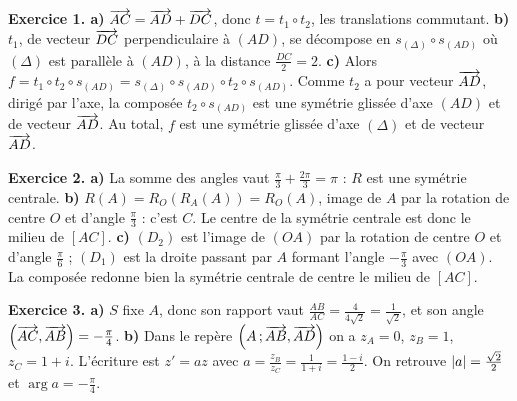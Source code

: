 \begin{corrige}
\textbf{Exercice 1. a)} $\overrightarrow{AC} = \overrightarrow{AD}+\overrightarrow{DC}$, donc
$t = t_{1} \circ t_{2}$, les translations commutant.
\textbf{b)} $t_{1}$, de vecteur $\overrightarrow{DC}$ perpendiculaire à $(AD)$, se
décompose en $s_{(\Delta)} \circ s_{(AD)}$ où $(\Delta)$ est parallèle à
$(AD)$, à la distance $\frac{DC}{2} = 2$.
\textbf{c)} Alors
$f = t_{1} \circ t_{2} \circ s_{(AD)}
= s_{(\Delta)} \circ s_{(AD)} \circ t_{2} \circ s_{(AD)}$. Comme $t_{2}$ a
pour vecteur $\overrightarrow{AD}$, dirigé par l'axe, la composée
$t_{2} \circ s_{(AD)}$ est une symétrie glissée d'axe $(AD)$ et de vecteur
$\overrightarrow{AD}$. Au total, $f$ est une symétrie glissée d'axe $(\Delta)$ et de
vecteur $\overrightarrow{AD}$.

\textbf{Exercice 2. a)} La somme des angles vaut $\frac{\pi}{3}+\frac{2\pi}{3} = \pi$ :
$R$ est une symétrie centrale.
\textbf{b)} $R(A) = R_{O}\left(R_{A}(A)\right) = R_{O}(A)$, image de $A$ par
la rotation de centre $O$ et d'angle $\frac{\pi}{3}$ : c'est $C$. Le centre de
la symétrie centrale est donc le milieu de $[AC]$.
\textbf{c)} $(D_{2})$ est l'image de $(OA)$ par la rotation de centre $O$ et
d'angle $\frac{\pi}{6}$ ; $(D_{1})$ est la droite passant par $A$ formant
l'angle $-\frac{\pi}{3}$ avec $(OA)$. La composée redonne bien la symétrie
centrale de centre le milieu de $[AC]$.

\textbf{Exercice 3. a)} $S$ fixe $A$, donc son rapport vaut
$\frac{AB}{AC} = \frac{4}{4\sqrt2} = \frac{1}{\sqrt2}$, et son angle
$\left(\overrightarrow{AC},\overrightarrow{AB}\right) = -\frac{\pi}{4}$.
\textbf{b)} Dans le repère $\left(A\,;\overrightarrow{AB},\overrightarrow{AD}\right)$ on a
$z_{A} = 0$, $z_{B} = 1$, $z_{C} = 1+i$. L'écriture est $z' = az$ avec
$a = \frac{z_{B}}{z_{C}} = \frac{1}{1+i} = \frac{1-i}{2}$. On retrouve
$\left|a\right| = \frac{\sqrt2}{2}$ et $\arg a = -\frac{\pi}{4}$.

\end{corrige}
